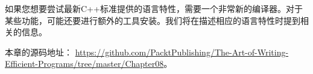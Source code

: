 如果您想要尝试最新C++标准提供的语言特性，需要一个非常新的编译器。对于某些功能，可能还要进行额外的工具安装。我们将在描述相应的语言特性时提到相关的信息。

本章的源码地址： \url{https://github.com/PacktPublishing/The-Art-of-Writing-Efficient-Programs/tree/master/Chapter08}。